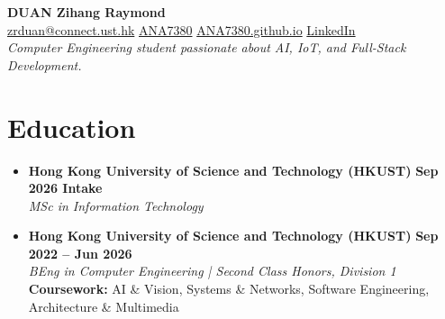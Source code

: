 \documentclass[a4paper,10pt]{article}
\begin{document}
\pagestyle{empty} %

\begin{center}
    {\LARGE \textbf{DUAN Zihang Raymond}} \\ \vspace{3pt}
    \small
    \faEnvelope \href{mailto:zrduan@connect.ust.hk}{ zrduan@connect.ust.hk} \quad
     \quad
    \faGithub \href{https://github.com/ANA7380}{ ANA7380} \quad
    \faGlobe \href{https://ANA7380.github.io}{ ANA7380.github.io} \quad
    \faLinkedin \href{https://www.linkedin.com/in/zihang-raymond-duan-3b51682b9/}{ LinkedIn} \\ \vspace{2pt}
    \textit{Computer Engineering student passionate about AI, IoT, and Full-Stack Development.}
\end{center}

\section{Education}
\begin{itemize}[leftmargin=*, label={}, itemsep=1pt]
    \item \textbf{Hong Kong University of Science and Technology (HKUST)} \hfill \textbf{Sep 2026 Intake} \\
    \textit{MSc in Information Technology}

    \item \textbf{Hong Kong University of Science and Technology (HKUST)} \hfill \textbf{Sep 2022 -- Jun 2026} \\
    \textit{BEng in Computer Engineering | Second Class Honors, Division 1} \\
    \textbf{Coursework:} AI \& Vision, Systems \& Networks, Software Engineering, Architecture \& Multimedia
\end{itemize}

\end{document}
